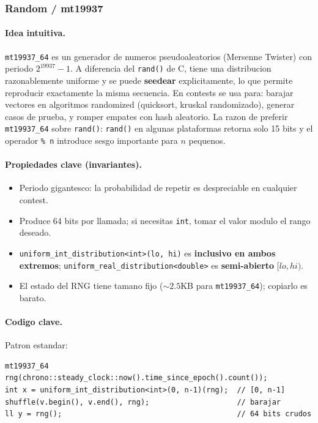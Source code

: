 ﻿\subsubsection{Random / mt19937}

\paragraph{Idea intuitiva.}
\texttt{mt19937\_64} es un generador de numeros pseudoaleatorios (Mersenne Twister) con periodo $2^{19937} - 1$. A diferencia del \texttt{rand()} de C, tiene una distribucion razonablemente uniforme y se puede \textbf{seedear} explicitamente, lo que permite reproducir exactamente la misma secuencia. En contests se usa para: barajar vectores en algoritmos randomized (quicksort, kruskal randomizado), generar casos de prueba, y romper empates con hash aleatorio. La razon de preferir \texttt{mt19937\_64} sobre \texttt{rand()}: \texttt{rand()} en algunas plataformas retorna solo 15 bits y el operador \texttt{\% n} introduce sesgo importante para $n$ pequenos.

\paragraph{Propiedades clave (invariantes).}
\begin{itemize}\setlength\itemsep{0pt}
	\item Periodo gigantesco: la probabilidad de repetir es despreciable en cualquier contest.
	\item Produce 64 bits por llamada; si necesitas \texttt{int}, tomar el valor modulo el rango deseado.
	\item \texttt{uniform\_int\_distribution<int>(lo, hi)} es \textbf{inclusivo en ambos extremos}; \texttt{uniform\_real\_distribution<double>} es \textbf{semi-abierto} $[lo, hi)$.
	\item El estado del RNG tiene tamano fijo ($\sim 2.5$KB para \texttt{mt19937\_64}); copiarlo es barato.
\end{itemize}

\paragraph{Codigo clave.}
Patron estandar:
\begin{verbatim}
mt19937_64 rng(chrono::steady_clock::now().time_since_epoch().count());
int x = uniform_int_distribution<int>(0, n-1)(rng);  // [0, n-1]
shuffle(v.begin(), v.end(), rng);                    // barajar
ll y = rng();                                        // 64 bits crudos
\end{verbatim}

